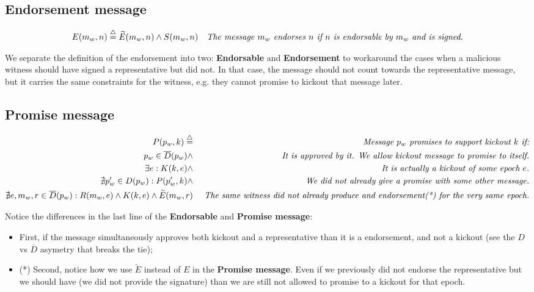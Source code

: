 \documentclass{article}
\begin{document}
\subsection*{Endorsement message}
\[
\begin{aligned}
E(m_w, n)  \buildrel\triangle\over = \widetilde{E}(m_w, n) \land S(m_w, n) && \textit{The message $m_w$ endorses $n$ if $n$ is endorsable by $m_w$ and is signed.}
\end{aligned}
\]

We separate the definition of the endorsement into two: \textbf{Endorsable} and \textbf{Endorsement} to workaround the cases when a malicious witness should have signed a representative but did not. In that case, the message should not count towards the representative message, but it carries the same constraints for the witness, e.g. they cannot promise to kickout that message later.

\subsection*{Promise message}
\[
\begin{aligned}
P(p_w, k)  \buildrel\triangle\over = & \text{   } & \textit{Message $p_w$ promises to support kickout $k$ if:} \\
p_w\in \overline{D}(p_w) \land & & \textit{It is approved by it. We allow kickout message to promise to itself.} \\
\exists e: K(k, e) \land & & \textit{It is actually a kickout of some epoch $e$.} \\
\nexists p'_w\in D(p_w): P(p'_w, k)\land & & \textit{We did not already give a promise with some other message.} \\
\nexists e, m_w, r\in \overline{D}(p_w): R(m_w, e)\land K(k, e) \land \widetilde{E}(m_w, r) && \textit{The same witness did not already produce and endorsement(*) for the very same epoch.}
\end{aligned}
\]

Notice the differences in the last line of the \textbf{Endorsable} and \textbf{Promise message}:
\begin{itemize}
\item First, if the message simultaneously approves both kickout and a representative than it is a endorsement, and not a kickout (see the $D$ vs $\overline{D}$ asymetry that breaks the tie);
\item (*) Second, notice how we use $\widetilde{E}$ instead of $E$ in the \textbf{Promise message}. Even if we previously did not endorse the representative but we should have (we did not provide the signature) than we are still not allowed to promise to a kickout for that epoch.
\end{itemize}
\end{document}
